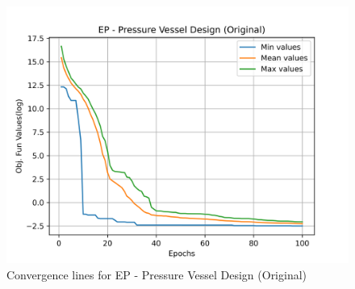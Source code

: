 \begin{figure}[H]
        \centering
        \caption{Convergence lines for EP - Pressure Vessel Design (Original)}
        \label{fig:pressure_vessel_problem_original_solve_ep}
        \includegraphics[scale=0.5]{images/pressure_vessel_problem_original_solve_ep.png}
        \end{figure}
        